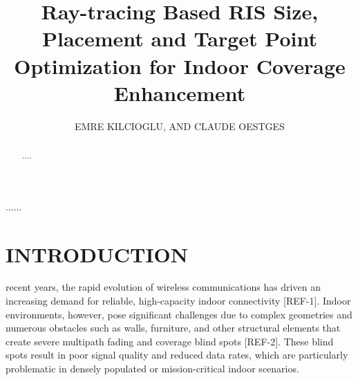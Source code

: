 \documentclass{IEEEoj}
\begin{document}

\title{Ray-tracing Based RIS Size, Placement and Target Point Optimization for Indoor Coverage Enhancement}

\author{EMRE KILCIOGLU, AND CLAUDE OESTGES}

\begin{abstract}
....
\end{abstract}

\begin{IEEEkeywords}
......
\end{IEEEkeywords}


\maketitle

\section{INTRODUCTION}
 recent years, the rapid evolution of wireless communications has driven an increasing demand for reliable, high-capacity indoor connectivity [REF-1]. Indoor environments, however, pose significant challenges due to complex geometries and numerous obstacles such as walls, furniture, and other structural elements that create severe multipath fading and coverage blind spots [REF-2]. These blind spots result in poor signal quality and reduced data rates, which are particularly problematic in densely populated or mission-critical indoor scenarios.
\end{document}
